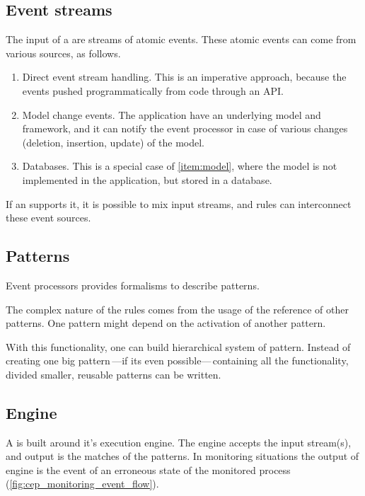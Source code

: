 \subsection{Event streams}
\label{subsection:event_streams}
The input of a \cep are streams of atomic events. These atomic events can come from various sources, as follows.
\begin{enumerate}
	\item Direct event stream handling. This is an imperative approach, because the events pushed programmatically from code through an API.

	\item Model change events. The application have an underlying model and framework, and it can notify the event processor in case of various changes (deletion, insertion, update) of the model.\label{item:model}

	\item Databases. This is a special case of \cref{item:model}, where the model is not implemented in the application, but stored in a database.
\end{enumerate}
\vspace{1ex}
If an \cep supports it, it is possible to mix input streams, and rules can interconnect these event sources.

\subsection{Patterns}
Event processors provides formalisms to describe patterns.

The complex nature of the rules comes from the usage of the reference of other patterns. One pattern might depend on the activation of another pattern.

With this functionality, one can build hierarchical system of pattern. Instead of creating one big pattern\,---if its even possible---\,containing all the functionality, divided smaller, reusable patterns can be written.

\subsection{Engine}

A \cep is built around it's execution engine. The engine accepts the input stream(s), and output is the matches of the patterns. In monitoring situations the output of engine is the event of an erroneous state of the monitored process (\cref{fig:cep_monitoring_event_flow}).

